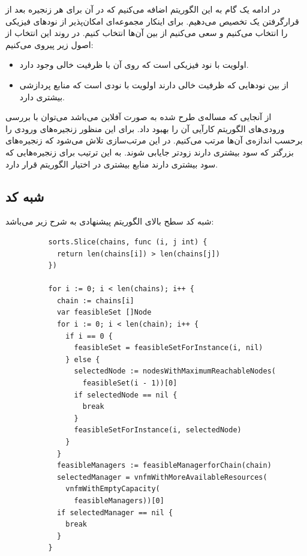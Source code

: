 در ادامه یک گام به این الگوریتم اضافه می‌کنیم که در آن برای هر زنجیره بعد از قرارگرفتن یک
تخصیص می‌دهیم. برای اینکار مجموعه‌ای امکان‌پذیر از نودهای فیزیکی را انتخاب می‌کنیم
و سعی می‌کنیم از بین آن‌ها انتخاب کنیم. در روند این انتخاب از اصول زیر پیروی می‌کنیم:

\begin{itemize}
    \item اولویت با نود فیزیکی است که روی آن  با ظرفیت خالی وجود دارد.
    \item از بین نودهایی که ظرفیت خالی دارند اولویت با نودی است که منابع پردازشی بیشتری دارد.
\end{itemize}

از آنجایی که مساله‌ی طرح شده به صورت آفلاین می‌باشد می‌توان با بررسی ورودی‌های الگوریتم کارآیی آن را بهبود داد.
برای این منظور زنجیره‌های ورودی را برحسب اندازه‌ی آن‌ها مرتب می‌کنیم.
در این مرتب‌سازی تلاش می‌شود که زنجیره‌های بزرگتر که سود بیشتری دارند زودتر جایابی شوند.
به این ترتیب برای زنجیره‌هایی که سود بیشتری دارند منابع بیشتری در اختیار الگوریتم قرار دارد.

\subsection{شبه کد}

شبه کد سطح بالای الگوریتم پیشنهادی به شرح زیر می‌باشد:

\begin{latin}
    \begin{verbatim}
          sorts.Slice(chains, func (i, j int) {
            return len(chains[i]) > len(chains[j])
          })
          
          for i := 0; i < len(chains); i++ {
            chain := chains[i]
            var feasibleSet []Node
            for i := 0; i < len(chain); i++ {
              if i == 0 {
                feasibleSet = feasibleSetForInstance(i, nil)
              } else {
                selectedNode := nodesWithMaximumReachableNodes(
                  feasibleSet(i - 1))[0]
                if selectedNode == nil {
                  break
                }
                feasibleSetForInstance(i, selectedNode)
              }
            }
            feasibleManagers := feasibleManagerforChain(chain)
            selectedManager = vnfmWithMoreAvailableResources(
              vnfmWithEmptyCapacity(
                feasibleManagers))[0]
            if selectedManager == nil {
              break
            }
          }
    \end{verbatim}
\end{latin}

